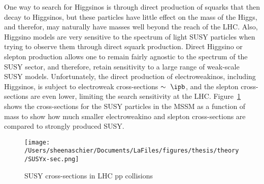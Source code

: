 One way to search for Higgsinos is through direct production of squarks that then decay to Higgsinos, but these particles have little effect on the mass of the Higgs, and therefor, may naturally have masses well beyond the reach of the LHC.  Also, Higgsino models are very sensitive to the spectrum of light SUSY particles when trying to observe them through direct squark production.  Direct Higgsino or slepton production allows one to remain fairly agnostic to the spectrum of the SUSY sector, and therefore, retain sensitivity to a large range of weak-scale SUSY models.  Unfortunately, the direct production of electroweakinos, including Higgsinos, is subject to electroweak cross-sections $\sim ~\ipb$, and the slepton cross-sections are even lower, limiting the search sensitivity at the LHC.  Figure~\ref{fig:thy:xsec} shows the cross-sections for the SUSY particles in the MSSM as a function of mass to show how much smaller electroweakino and slepton cross-sections are compared to strongly produced SUSY.

     \begin{figure}%
  \begin{center}
  \texttt{[image: /Users/sheenaschier/Documents/LaFiles/figures/thesis/theory/SUSYx-sec.png]}
   \end{center}
 \caption{SUSY cross-sections in LHC pp collisions~\cite{Bechtle:2015nta}}
 \label{fig:thy:xsec}
 \end{figure}

